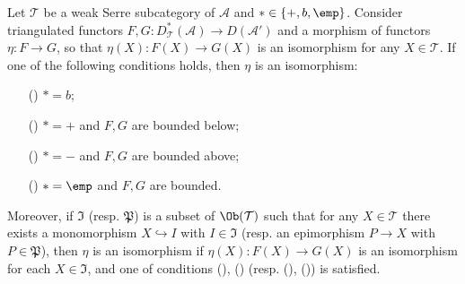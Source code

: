 \begin{proposition}\label{derived category way-out lemma}
Let $\mathcal{T}$ be a weak Serre subcategory of $\mathcal{A}$ and $*\in\{+,b,\emp\}$. Consider triangulated functors $F,G:D^*_\mathcal{T}(\mathcal{A})\to D(\mathcal{A}')$ and a morphism of functors $\eta:F\to G$, so that $\eta(X):F(X)\to G(X)$ is an isomorphism for any $X\in\mathcal{T}$. If one of the following conditions holds, then $\eta$ is an isomorphism:
\begin{enumerate}
    \item[(\rmnum{1})] $*=b$;
    \item[(\rmnum{2})] $*=+$ and $F,G$ are bounded below;
    \item[(\rmnum{3})] $*=-$ and $F,G$ are bounded above;
    \item[(\rmnum{4})] $*=\emp$ and $F,G$ are bounded.
\end{enumerate}
Moreover, if $\mathfrak{I}$ (resp. $\mathfrak{P}$) is a subset of $\Ob(\mathcal{T})$ such that for any $X\in\mathcal{T}$ there exists a monomorphism $X\hookrightarrow I$ with $I\in\mathfrak{I}$ (resp. an epimorphism $P\to X$ with $P\in\mathfrak{P}$), then $\eta$ is an isomorphism if $\eta(X):F(X)\to G(X)$ is an isomorphism for each $X\in\mathfrak{I}$, and one of conditions (), () (resp. (), ()) is satisfied.
\end{proposition}
